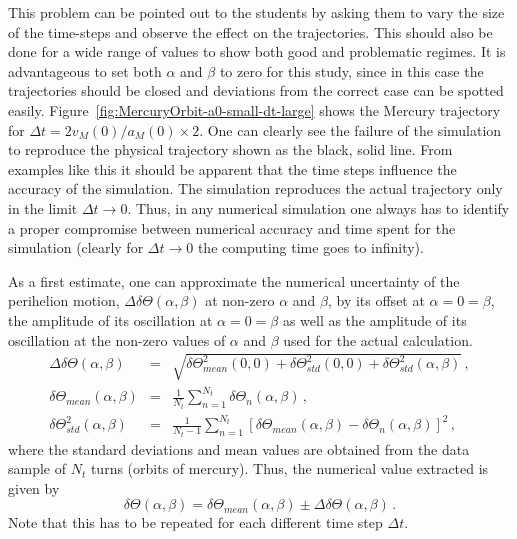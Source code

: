 \documentclass[12pt,ngerman,american]{iopart}
\begin{document}
This problem can be pointed out to the students by asking them to vary the size of the time-steps and observe the effect on the trajectories.
This should also be done for a wide range of values to show both good and problematic regimes.
It is advantageous to set both $\alpha$ and $\beta$ to zero for this study, since in this case the trajectories should be closed and deviations from the correct case can be spotted easily.
Figure~\ref{fig:MercuryOrbit-a0-small-dt-large} shows the Mercury trajectory for $\Delta t=2 v_M(0) /a_M(0) \times 2$.
One can clearly see the failure of the simulation to reproduce the physical trajectory shown as the black, solid line.
From examples like this it should be apparent that the time steps influence the accuracy of the simulation.
The simulation reproduces the actual trajectory only in the limit $\Delta t \rightarrow 0$. Thus, in any numerical simulation
one always has to identify a proper compromise between numerical accuracy and time spent for the simulation
(clearly for $\Delta t\to 0$ the computing time goes to infinity).

As a first estimate, one can approximate the numerical uncertainty of the perihelion motion, $\Delta \delta \Theta (\alpha, \beta)$ at non-zero $\alpha$ and $\beta$, by its offset
 at $\alpha = 0 = \beta$,  the amplitude of its oscillation at $\alpha = 0 = \beta$ as well as the amplitude of its oscillation at the non-zero values of $\alpha$ and $\beta$
 used for the actual calculation.
\begin{eqnarray}\label{eq:num-uncertainty}
	\Delta \delta \Theta (\alpha, \beta) &=& \sqrt{
		\delta \Theta_{mean}^2 (0, 0) +
		\delta \Theta_{std}^2 (0, 0) +
		\delta \Theta_{std}^2 (\alpha, \beta)
	} \, ,
	\\
	\delta \Theta_{mean} (\alpha, \beta)
	&=& 
	\frac{1}{N_{t}}
	\sum\limits_{n=1}^{N_{t}} \delta \Theta_{n} (\alpha, \beta) \, ,
	\\
	\delta \Theta_{std}^2 (\alpha, \beta)
	&=& 
	\frac{1}{N_{t}-1}
	\sum\limits_{n=1}^{N_{t}} \left[
		\delta \Theta_{mean} (\alpha, \beta) - \delta \Theta_{n} (\alpha, \beta)
	\right]^2 \, ,
\end{eqnarray}
where the standard deviations and mean values are obtained from the data sample of $N_t$ turns (orbits of mercury).
Thus, the numerical value extracted is given by
\begin{equation}\label{eq:num-vals}
	\delta \Theta (\alpha, \beta) = \delta \Theta_{mean} (\alpha, \beta)  \pm \Delta \delta \Theta (\alpha, \beta)
	\, .
\end{equation}
Note that this has to be repeated for each different time step $\Delta t$.
\end{document}
